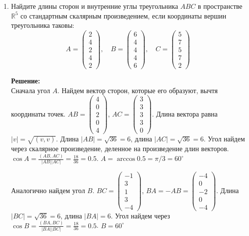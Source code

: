 \documentclass[a4paper,12pt]{article}
\begin{document}
\begin{enumerate}
\item Найдите длины сторон и внутренние углы треугольника $ABC$ в пространстве $\mathbb R^5$ со стандартным скалярным произведением, если координаты вершин треугольника таковы:
\[
A = 
\begin{pmatrix}
{2}\\{4}\\{2}\\{4}\\{2}
\end{pmatrix}
,\quad
B = 
\begin{pmatrix}
{6}\\{4}\\{4}\\{4}\\{6}
\end{pmatrix}
,\quad
C = 
\begin{pmatrix}
{5}\\{7}\\{5}\\{7}\\{2}
\end{pmatrix}
\]
\vspace{5pt}

\textbf{Решение:}\\
Сначала угол $A$. Найдем вектор сторон, которые его образуют, вычтя координаты точек. $AB = \begin{pmatrix}
4\\0\\2\\0\\4
\end{pmatrix}$, $AC = \begin{pmatrix}
3\\3\\3\\3\\0
\end{pmatrix}$. Длина вектора равна $|v| = \sqrt{(v,v)}$. Длина $|AB| = \sqrt{36}=6$, длина $|AC| = \sqrt{36}=6$. Угол найдем через скалярное произведение, деленное на произведение длин векторов. $\cos{A}= \frac{(AB,AC)}{|AB| |AC|}=\frac{18}{36}=0.5$. $A=\arccos{0.5} = \pi/3=60^{\circ}$

Аналогично найдем угол $B$.
$BC = \begin{pmatrix}
-1\\3\\1\\3\\-4
\end{pmatrix}$, $BA=-AB = \begin{pmatrix}
-4\\0\\-2\\0\\-4
\end{pmatrix}$. Длина $|BC| = \sqrt{36}=6$, длина $|BA|=6$. Угол найдем через $\cos{B}= \frac{(BA,BC)}{|BA| |BC|}=\frac{18}{36}=0.5$. $B=60^{\circ}$


\end{enumerate}
\end{document}
